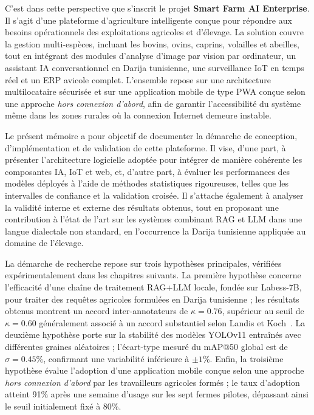 C'est dans cette perspective que s'inscrit le projet \textbf{Smart Farm AI
Enterprise}. Il s'agit d'une plateforme d'agriculture intelligente conçue pour
répondre aux besoins opérationnels des exploitations agricoles et d'élevage. La
solution couvre la gestion multi-espèces, incluant les bovins, ovins, caprins,
volailles et abeilles, tout en intégrant des modules d'analyse d'image par
vision par ordinateur, un assistant IA conversationnel en Darija tunisienne, une
surveillance IoT en temps réel et un ERP avicole complet. L'ensemble repose sur
une architecture multilocataire sécurisée et sur une application mobile de type
PWA conçue selon une approche \textit{hors connexion d'abord}, afin de garantir l'accessibilité du système même
dans les zones rurales où la connexion Internet demeure instable.

Le présent mémoire a pour objectif de documenter la démarche de conception,
d'implémentation et de validation de cette plateforme. Il vise, d'une part, à
présenter l'architecture logicielle adoptée pour intégrer de manière cohérente
les composantes IA, IoT et web, et, d'autre part, à évaluer les performances des
modèles déployés à l'aide de méthodes statistiques rigoureuses, telles que les
intervalles de confiance et la validation croisée. Il s'attache également à
analyser la validité interne et externe des résultats obtenus, tout en proposant
une contribution à l'état de l'art sur les systèmes combinant RAG et LLM dans
une langue dialectale non standard, en l'occurrence la Darija tunisienne
appliquée au domaine de l'élevage.

La démarche de recherche repose sur trois hypothèses principales, vérifiées
expérimentalement dans les chapitres suivants. La première hypothèse concerne
l'efficacité d'une chaîne de traitement RAG+LLM locale, fondée sur Labess-7B, pour traiter des
requêtes agricoles formulées en Darija tunisienne ; les résultats obtenus
montrent un accord inter-annotateurs de $\kappa = 0.76$, supérieur au seuil de
$\kappa = 0.60$ généralement associé à un accord substantiel selon Landis et
Koch~\cite{landis1977}. La deuxième hypothèse porte sur la stabilité des modèles
YOLOv11 entraînés avec différentes graines aléatoires ; l'écart-type mesuré du
mAP@50 global est de $\sigma = 0.45\%$, confirmant une variabilité inférieure à
$\pm 1\%$. Enfin, la troisième hypothèse évalue l'adoption d'une application
mobile conçue selon une approche \textit{hors connexion d'abord} par les travailleurs agricoles formés ; le taux
d'adoption atteint 91\% après une semaine d'usage sur les sept fermes pilotes,
dépassant ainsi le seuil initialement fixé à 80\%.

